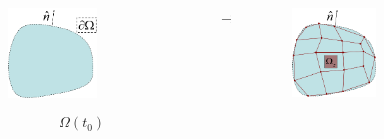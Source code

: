 \documentclass[8pt,xcolor=svgnames]{beamer}
\begin{document}
\begin{frame}
\begin{columns}
  \begin{column}{0.4\textwidth}
   \begin{figure}[h!]
    \centering
    \includegraphics[width=0.6\textwidth,keepaspectratio=true]{./Images/discretization1.png}
    \end{figure}
    \begin{Large}
    \[
     \Omega (t_0)
    \]
    \end{Large}
  \end{column}
  \begin{column}{0.1\textwidth}
   \Huge{$\mathbf{\longrightarrow}$}
  \end{column}
  \begin{column}{0.4\textwidth}
   \begin{figure}[h!]
    \centering
    \includegraphics[width=0.6\textwidth,keepaspectratio=true]{./Images/discretization2.png}
    \end{figure}
    \begin{Large}

\end{Large}
\end{column}
\end{columns}
\end{frame}
\end{document}
